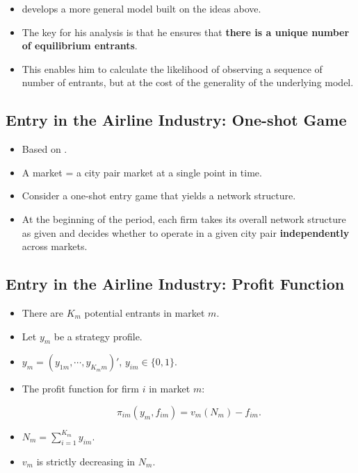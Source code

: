 \documentclass[]{book}
\providecommand{\tightlist}{%
  \setlength{\itemsep}{0pt}\setlength{\parskip}{0pt}}
\begin{document}
\begin{itemize}
\tightlist
\item
  \citet{berry_estimation_1992} develops a more general model built on
  the ideas above.
\item
  The key for his analysis is that he ensures that \textbf{there is a
  unique number of equilibrium entrants}.
\item
  This enables him to calculate the likelihood of observing a sequence
  of number of entrants, but at the cost of the generality of the
  underlying model.
\end{itemize}

\subsection{Entry in the Airline Industry: One-shot
Game}\label{entry-in-the-airline-industry-one-shot-game}

\begin{itemize}
\tightlist
\item
  Based on \citet{berry_estimation_1992}.
\item
  A market = a city pair market at a single point in time.
\item
  Consider a one-shot entry game that yields a network structure.
\item
  At the beginning of the period, each firm takes its overall network
  structure as given and decides whether to operate in a given city pair
  \textbf{independently} across markets.
\end{itemize}

\subsection{Entry in the Airline Industry: Profit
Function}\label{entry-in-the-airline-industry-profit-function}

\begin{itemize}
\tightlist
\item
  There are \(K_m\) potential entrants in market \(m\).
\item
  Let \(y_m\) be a strategy profile.
\item
  \(y_m = (y_{1m}, \cdots, y_{K_m m})'\), \(y_{im} \in \{0, 1\}\).
\item
  The profit function for firm \(i\) in market \(m\):

  \begin{equation}
  \pi_{im}(y_m, f_{im}) = v_m\left(N_{m}\right) - f_{im}.
  \end{equation}
\item
  \(N_{m} = \sum_{i = 1}^{K_m} y_{im}\).
\item
  \(v_m\) is strictly decreasing in \(N_m\).
\end{itemize}
\end{document}
